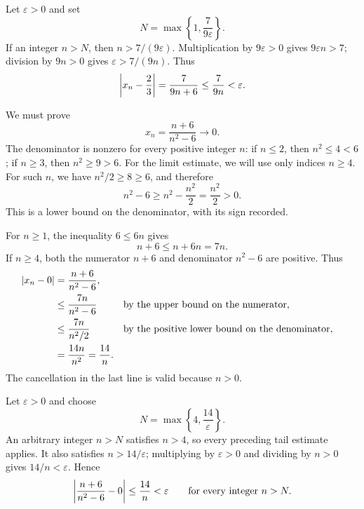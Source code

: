 Let $\varepsilon>0$ and set
\[
 N=\max\left\{1,\frac7{9\varepsilon}\right\}.
\]
If an integer $n>N$, then $n>7/(9\varepsilon)$.
Multiplication by $9\varepsilon>0$ gives $9\varepsilon n>7$;
division by $9n>0$ gives $\varepsilon>7/(9n)$. Thus
\[
 \left|x_n-\frac23\right|=\frac7{9n+6}\le\frac7{9n}<\varepsilon.
\]


We must prove
\[
 x_n=\frac{n+6}{n^2-6}\longrightarrow0.
\]
The denominator is nonzero for every positive integer $n$: if $n\le2$,
then $n^2\le4<6$; if $n\ge3$, then $n^2\ge9>6$.
For the limit estimate, we will use only indices $n\ge4$.
For such $n$, we have $n^2/2\ge8\ge6$, and therefore
\[
 n^2-6\ge n^2-\frac{n^2}{2}=\frac{n^2}{2}>0.
\]
This is a lower bound on the denominator, with its sign recorded.

For $n\ge1$, the inequality $6\le6n$ gives
\[
 n+6\le n+6n=7n.
\]
If $n\ge4$, both the numerator $n+6$ and denominator $n^2-6$ are
positive. Thus
\begin{align*}
 \left|x_n-0\right|
   &=\frac{n+6}{n^2-6},\\
   &\le\frac{7n}{n^2-6}
      &&\text{by the upper bound on the numerator},\\
   &\le\frac{7n}{n^2/2}
      &&\text{by the positive lower bound on the denominator},\\
   &=\frac{14n}{n^2}=\frac{14}{n}.
\end{align*}
The cancellation in the last line is valid because $n>0$.

Let $\varepsilon>0$ and choose
\[
 N=\max\left\{4,\frac{14}{\varepsilon}\right\}.
\]
An arbitrary integer $n>N$ satisfies $n>4$, so every preceding tail
estimate applies. It also satisfies $n>14/\varepsilon$; multiplying
by $\varepsilon>0$ and dividing by $n>0$ gives $14/n<\varepsilon$.
Hence
\[
 \left|\frac{n+6}{n^2-6}-0\right|\le\frac{14}{n}<\varepsilon
 \qquad\text{for every integer }n>N.
\]


